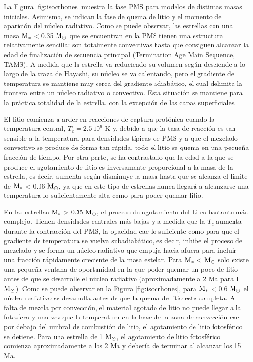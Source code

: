 La Figura \ref{fig:isocrhones} muestra la fase PMS para modelos de distintas masas iniciales. Asimismo, se indican la fase de quema de litio y el momento de aparición del núcleo radiativo. Como se puede observar, las estrellas con una masa $\mathrm{M}_*$ < 0.35 $\mathrm{M}_\odot$ que se encuentran en la PMS tienen una estructura relativamente sencilla: son totalmente convectivas hasta que consiguen alcanzar la edad de finalización de secuencia principal (Termination Age Main Sequence, TAMS). A medida que la estrella va reduciendo su volumen según desciende a lo largo de la traza de Hayashi, su núcleo se va calentando, pero el gradiente de temperatura se mantiene muy cerca del gradiente adiabático, el cual delimita la frontera entre un núcleo radiativo o convectivo. Esta situación se mantiene para la práctica totalidad de la estrella, con la excepción de las capas superficiales.\par 

El litio comienza a arder en reacciones de captura protónica cuando la temperatura central, $T_c=2.5 \, 10^{6}$ K y, debido a que la tasa de reacción es tan sensible a la temperatura para densidades típicas de PMS \citep{Randich2006} y a que el mezclado convectivo se produce de forma tan rápida, todo el litio se quema en una pequeña fracción de tiempo. Por otra parte, se ha contrastado que la edad a la que se produce el agotamiento de litio es inversamente proporcional a la masa de la estrella, es decir, aumenta según disminuye la masa hasta que se alcanza el límite de $\mathrm{M}_*$ < 0.06 $\mathrm{M}_\odot$, ya que en este tipo de estrellas nunca llegará a alcanzarse una temperatura lo suficientemente alta como para poder quemar litio.\par

En las estrellas $\mathrm{M}_*$ > 0.35 $\mathrm{M}_\odot$, el proceso de agotamiento del Li es bastante más complejo. Tienen densidades centrales más bajas y a medida que la $T_c$ aumenta durante la contracción del PMS, la opacidad cae lo suficiente como para que el gradiente de temperatura se vuelva subadiabático, es decir, inhibe el proceso de mezclado y se forma un núcleo radiativo que empuja hacia afuera para incluir una fracción rápidamente creciente de la masa estelar.  Para $\mathrm{M}_*$ <  $\mathrm{M}_\odot$ solo existe una pequeña ventana de oportunidad en la que poder quemar un poco de litio antes de que se desarrolle el núcleo radiativo (aproximadamente a 2 Ma para 1 $\mathrm{M}_\odot$). Como se puede observar en la Figura \ref{fig:isocrhones}, para $\mathrm{M}_*$ < 0.6 $\mathrm{M}_\odot$ el núcleo radiativo se desarrolla antes de que la quema de litio esté completa. A falta de mezcla por convección, el material agotado de litio no puede llegar a la fotosfera y una vez que la temperatura en la base de la zona de convección cae por debajo del umbral de combustión de litio, el agotamiento de litio fotosférico se detiene. Para una estrella de 1 $\mathrm{M}_\odot$, el agotamiento de litio fotosférico comienza aproximadamente a los 2 Ma y debería de terminar al alcanzar los 15 Ma.\par

